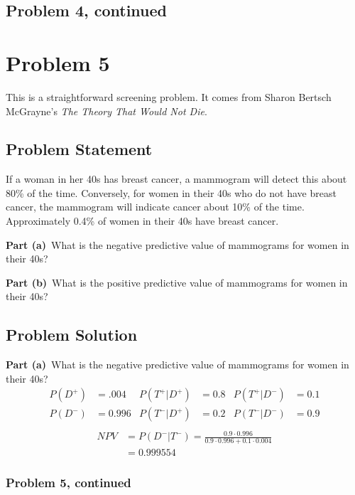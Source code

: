 \documentclass[12pt]{article}
\theoremstyle{definition}
\begin{document}
\newpage
\subsection*{Problem 4, continued}


\newpage
\section*{Problem 5}

This is a straightforward screening problem. It comes from Sharon Bertsch McGrayne's {\em The Theory That Would Not Die}.

\subsection*{Problem Statement}

If a woman in her 40s has breast cancer, a mammogram will detect this about 80\% of the time. Conversely, for women in their 40s who do not have breast cancer, the mammogram will indicate cancer about 10\% of the time. Approximately 0.4\% of women in their 40s have breast cancer.

\bigskip
\noindent
{\bf Part (a)}\ What is the negative predictive value of mammograms for women in their 40s?

\bigskip
\noindent
{\bf Part (b)}\ What is the positive predictive value of mammograms for women in their 40s?


\subsection*{Problem Solution}

{\bf Part (a)}\ What is the negative predictive value of mammograms for women in their 40s?
\begin{align*}
P(D^+) &= .004 &P(T^+|D^+) &= 0.8 &P(T^+|D^-) &= 0.1\\
P(D^-)&= 0.996 &P(T^-|D^+) &= 0.2 &P(T^-|D^-) &= 0.9\\
\end{align*}
\begin{align*}
NPV &= P(D^-|T^-) = \frac{0.9 \cdot 0.996}{0.9 \cdot 0.996 + 0.1 \cdot 0.004}\\
&= 0.999554
\end{align*}

\newpage
\subsubsection*{Problem 5, continued}
\end{document}
